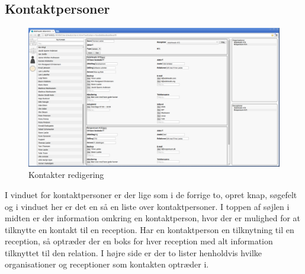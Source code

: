 \subsection{Kontaktpersoner}
\begin{figure}[ht!]
\centering
\includegraphics[width=\textwidth]{images/screen_con.png}
\caption{Kontakter redigering}
\label{fig:screencon}
\end{figure}
I vinduet for kontaktpersoner er der lige som i de forrige to, opret knap, søgefelt og i vinduet her er det en så en liste over kontaktpersoner. I toppen af søjlen i midten er der information omkring en kontaktperson, hvor der er mulighed for at tilknytte en kontakt til en reception. Har en kontaktperson en tilknytning til en reception, så optræder der en boks for hver reception med alt information tilknyttet til den relation. I højre side er der to lister henholdvis hvilke organisationer og receptioner som kontakten optræder i.

